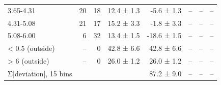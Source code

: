 \begin{table}[htbp]
\begin{tabular}{lrrrrrrr}
3.65-4.31 & 20 & 18 & 12.4 ± 1.3 & -5.6 ± 1.3 & -- & -- & -- \\
4.31-5.08 & 21 & 17 & 15.2 ± 3.3 & -1.8 ± 3.3 & -- & -- & -- \\
5.08-6.00 & 6 & 32 & 13.4 ± 1.5 & -18.6 ± 1.5 & -- & -- & -- \\
< 0.5 (outside) & -- & 0 & 42.8 ± 6.6 & 42.8 ± 6.6 & -- & -- & -- \\
> 6 (outside) & -- & 0 & 26.0 ± 1.2 & 26.0 ± 1.2 & -- & -- & -- \\
Σ|deviation|, 15 bins &  &  &  & 87.2 ± 9.0 & -- & -- & -- \\
\bottomrule
\end{tabular}
\end{table}
